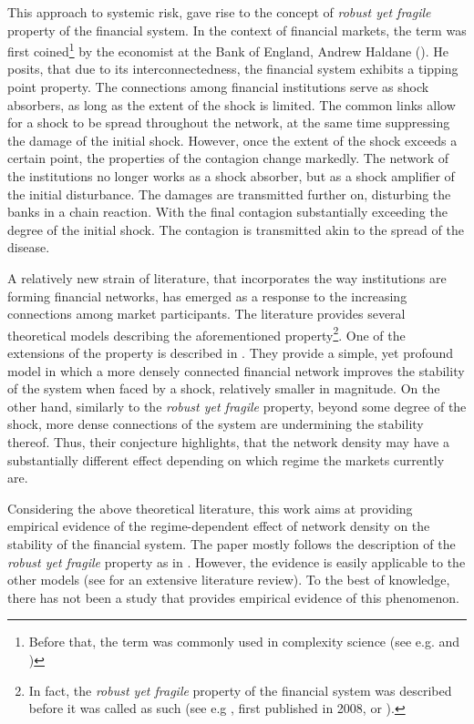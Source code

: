 \documentclass[12pt]{article}
\begin{document}
This approach to systemic risk, gave rise to the concept of \textit{robust yet fragile} property of the financial system. In the context of financial markets, the term was first coined\footnote{Before that, the term was commonly used in complexity science (see e.g. \cite{doyle05} and \cite{carlson02})} by the economist at the Bank of England, Andrew Haldane (\cite{haldane13}). He posits, that due to its interconnectedness, the financial system exhibits a tipping point property. The connections among financial institutions serve as shock absorbers, as long as the extent of the shock is limited. The common links allow for a shock to be spread throughout the network, at the same time suppressing the damage of the initial shock. However, once the extent of the shock exceeds a certain point, the properties of the contagion change markedly. The network of the institutions no longer works as a shock absorber, but as a shock amplifier of the initial disturbance. The damages are transmitted further on, disturbing the banks in a chain reaction. With the final contagion substantially exceeding the degree of the initial shock. The contagion is transmitted akin to the spread of the disease. 

A relatively new strain of literature, that incorporates the way institutions are forming financial networks, has emerged as a response to the increasing connections among market participants. The literature provides several theoretical models describing the aforementioned property\footnote{In fact, the \textit{robust yet fragile} property of the financial system was described before it was called as such (see e.g \cite{gai10}, first published in 2008, or \cite{gallegati08}).}. One of the extensions of the property is described in \cite{acemoglu13}. They provide a simple, yet profound model in which a more densely connected financial network improves the stability of the system when faced by a shock, relatively smaller in magnitude. On the other hand, similarly to the \textit{robust yet fragile} property, beyond some degree of the shock, more dense connections of the system are undermining the stability thereof. Thus, their conjecture highlights, that the network density may have a substantially different effect depending on which regime the markets currently are. 

Considering the above theoretical literature, this work aims at providing empirical evidence of the regime-dependent effect of network density on the stability of the financial system. The paper mostly follows the description of the \textit{robust yet fragile} property as in \cite{acemoglu13}. However, the evidence is easily applicable to the other models (see \cite{glasserman16} for an extensive literature review). To the best of knowledge, there has not been a study that provides empirical evidence of this phenomenon.
\end{document}
